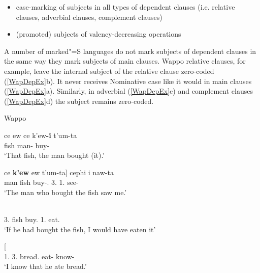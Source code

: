 \begin{itemize}
\item case-marking of subjects in all types of dependent clauses (i.e. relative clauses, adverbial clauses, complement clauses)
\item (promoted) subjects of valency-decreasing operations
\end{itemize}

A number of marked"=S languages do not mark subjects of dependent clauses in the same way they mark subjects of main clauses.
Wappo relative clauses, for example, leave the internal subject of the relative clause  zero-coded (\ref{WapDepEx}b). 
It never receives Nominative case like it would in main clauses (\ref{WapDepEx}a). Similarly, in adverbial (\ref{WapDepEx}c) and complement clauses (\ref{WapDepEx}d) the subject remains zero-coded.

\begin{exe}\ex\label{WapDepEx} \begin{sloppypar}{Wappo} \citetext{Wappo-Yukian; California; \citealt[4, 117, 77]{Thompsonetal:2006}, \citealt[239]{Adverbial}}\end{sloppypar}\nopagebreak[4]
\begin{xlist}
\ex\gll ce ew ce k'ew\textbf{-i} t'um-ta\textglotstop\\
\dem{} fish \dem{} man-\nom{} buy-\pst{}\\
`That fish, the man bought (it).'

\ex \gll  {\rm[}ce \textbf{k'ew} ew t'um-ta{\rm]} cephi i naw-ta\textglotstop\\
\dem{} man fish buy-\pst{}.\dep{} 3\sg{}.\nom{} 1\sg{}.\acc{} see-\pst{}\\
`The man who bought the fish saw me.'

\ex\label{WapCondCl}\gll  {\rm[}    \textipa{cel'}{\rm]}    \\
3\sg{}.\acc{} \dem{} fish buy.\dep{} \cond{} \opt{} 1\sg{}.\nom{} \dem{} eat.\Hyp{}\\
`If he had bought the fish, I would have eaten it' %

\ex\gll{}  {\rm[}\textbf{}  \textipa{pa\textglotstop-tah}{\rm]} \\
1\sg{}.\nom{} 3\sg{}.\acc{} bread.\acc{} eat-\pst{} know-\neu{}\_\fut{}\\
`I know that he ate bread.' 
\end{xlist} 
\end{exe}

